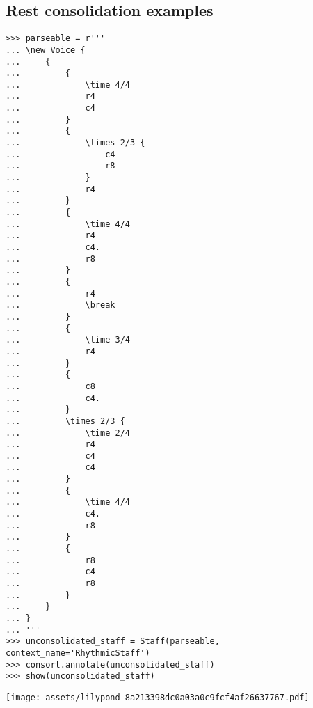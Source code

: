 \subsection{Rest consolidation examples}

\begin{comment}
<abjad>
parseable = r'''
\new Voice {
    {
        {
            \time 4/4
            r4
            c4
        }
        {
            \times 2/3 {
                c4
                r8
            }
            r4
        }
        {
            \time 4/4
            r4
            c4.
            r8
        }
        {
            r4
            \break
        }
        {
            \time 3/4
            r4
        }
        {
            c8
            c4.
        }
        \times 2/3 {
            \time 2/4
            r4
            c4
            c4
        }
        {
            \time 4/4
            c4.
            r8
        }
        {
            r8
            c4
            r8
        }
    }
}
'''
unconsolidated_staff = Staff(parseable, context_name='RhythmicStaff')
consort.annotate(unconsolidated_staff)
show(unconsolidated_staff)
</abjad>
\end{comment}

\begin{singlespacing}
\vspace{-0.5\baselineskip}
\begin{lstlisting}
>>> parseable = r'''
... \new Voice {
...     {
...         {
...             \time 4/4
...             r4
...             c4
...         }
...         {
...             \times 2/3 {
...                 c4
...                 r8
...             }
...             r4
...         }
...         {
...             \time 4/4
...             r4
...             c4.
...             r8
...         }
...         {
...             r4
...             \break
...         }
...         {
...             \time 3/4
...             r4
...         }
...         {
...             c8
...             c4.
...         }
...         \times 2/3 {
...             \time 2/4
...             r4
...             c4
...             c4
...         }
...         {
...             \time 4/4
...             c4.
...             r8
...         }
...         {
...             r8
...             c4
...             r8
...         }
...     }
... }
... '''
>>> unconsolidated_staff = Staff(parseable, context_name='RhythmicStaff')
>>> consort.annotate(unconsolidated_staff)
>>> show(unconsolidated_staff)
\end{lstlisting}
\noindent\texttt{[image: assets/lilypond-8a213398dc0a03a0c9fcf4af26637767.pdf]}
\end{singlespacing}

